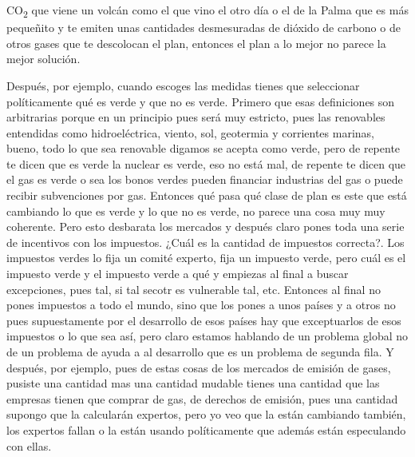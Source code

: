 CO\textsubscript{2} que viene un volcán como el que vino el otro día o el de la Palma que es más pequeñito y te emiten unas cantidades desmesuradas de dióxido de carbono o de otros gases que te descolocan el plan, entonces el plan a lo mejor no parece la mejor solución.

Después, por ejemplo, cuando escoges las medidas tienes que seleccionar políticamente qué es verde y que no es verde. Primero que esas definiciones son arbitrarias porque en un principio pues será muy estricto, pues las renovables entendidas como hidroeléctrica, viento, sol, geotermia y corrientes marinas, bueno, todo lo que sea renovable digamos se acepta como verde, pero de repente te dicen que es verde la nuclear es verde, eso no está mal, de repente te dicen que el gas es verde o sea los bonos verdes pueden financiar industrias del gas o puede recibir subvenciones por gas. Entonces qué pasa qué clase de plan es este que está cambiando lo que es verde y lo que no es verde, no parece una cosa muy muy coherente. Pero esto desbarata los mercados y después claro pones toda una serie de incentivos con los impuestos. ¿Cuál es la cantidad de impuestos correcta?. Los impuestos verdes lo fija un comité experto, fija un impuesto verde, pero cuál es el impuesto verde y el impuesto verde a qué y empiezas al final a buscar excepciones, pues tal, si tal secotr es vulnerable tal, etc. Entonces al final no pones impuestos a todo el mundo, sino que los pones a unos países y a otros no pues supuestamente por el desarrollo de esos países hay que exceptuarlos de esos impuestos o lo que sea así, pero claro estamos hablando de un problema global no de un problema de ayuda a al desarrollo que es un problema de segunda fila. Y después, por ejemplo, pues de estas cosas de los mercados de emisión de gases, pusiste una cantidad mas una cantidad mudable tienes una cantidad que las empresas tienen que comprar de gas, de derechos de emisión, pues una cantidad supongo que la calcularán expertos, pero yo veo que la están cambiando también, los expertos fallan o la están usando políticamente que además están especulando con ellas.

